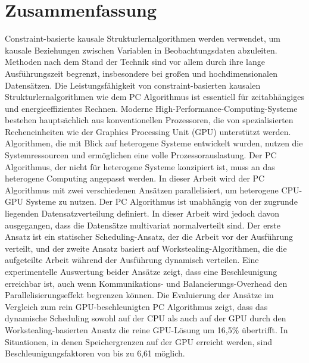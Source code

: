\chapter*{Zusammenfassung}
Constraint-basierte kausale Strukturlernalgorithmen werden verwendet, um kausale Beziehungen zwischen Variablen in Beobachtungsdaten abzuleiten. Methoden nach dem Stand der Technik sind vor allem durch ihre lange Ausführungszeit begrenzt, insbesondere bei großen und hochdimensionalen Datensätzen. Die Leistungsfähigkeit von constraint-basierten kausalen Strukturlernalgorithmen wie dem PC Algorithmus ist essentiell für zeitabhängiges und energieeffizientes Rechnen. Moderne High-Performance-Computing-Systeme bestehen hauptsächlich aus konventionellen Prozessoren, die von spezialisierten Recheneinheiten wie der Graphics Processing Unit (GPU) unterstützt werden. Algorithmen, die mit Blick auf heterogene Systeme entwickelt wurden, nutzen die Systemressourcen und ermöglichen eine volle Prozessorauslastung. Der PC Algorithmus, der nicht für heterogene Systeme konzipiert ist, muss an das heterogene Computing angepasst werden. In dieser Arbeit wird der PC Algorithmus mit zwei verschiedenen Ansätzen parallelisiert, um heterogene CPU-GPU Systeme zu nutzen. Der PC Algorithmus ist unabhängig von der zugrunde liegenden Datensatzverteilung definiert. In dieser Arbeit wird jedoch davon ausgegangen, dass die Datensätze multivariat normalverteilt sind. Der erste Ansatz ist ein statischer Scheduling-Ansatz, der die Arbeit vor der Ausführung verteilt, und der zweite Ansatz basiert auf Workstealing-Algorithmen, die die aufgeteilte Arbeit während der Ausführung dynamisch verteilen. Eine experimentelle Auswertung beider Ansätze zeigt, dass eine Beschleunigung erreichbar ist, auch wenn Kommunikations- und Balancierungs-Overhead den Parallelisierungseffekt begrenzen können. Die Evaluierung der Ansätze im Vergleich zum rein GPU-beschleunigten PC Algorithmus zeigt, dass das dynamische Scheduling sowohl auf der CPU als auch auf der GPU durch den Workstealing-basierten Ansatz die reine GPU-Lösung um 16,5\% übertrifft. In Situationen, in denen Speichergrenzen auf der GPU erreicht werden, sind Beschleunigungsfaktoren von bis zu 6,61 möglich.
